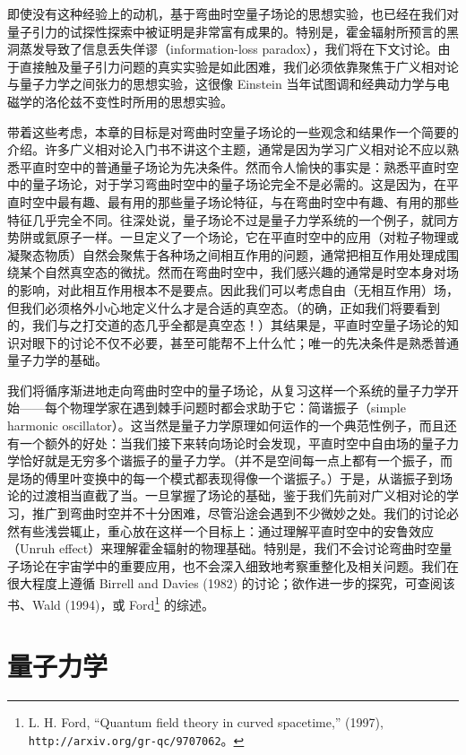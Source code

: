 即使没有这种经验上的动机，基于弯曲时空量子场论的思想实验，也已经在我们对量子引力的试探性探索中被证明是非常富有成果的。特别是，霍金辐射所预言的黑洞蒸发导致了信息丢失佯谬（information-loss paradox），我们将在下文讨论。由于直接触及量子引力问题的真实实验是如此困难，我们必须依靠聚焦于广义相对论与量子力学之间张力的思想实验，这很像 Einstein 当年试图调和经典动力学与电磁学的洛伦兹不变性时所用的思想实验。

带着这些考虑，本章的目标是对弯曲时空量子场论的一些观念和结果作一个简要的介绍。许多广义相对论入门书不讲这个主题，通常是因为学习广义相对论不应以熟悉平直时空中的普通量子场论为先决条件。然而令人愉快的事实是：熟悉平直时空中的量子场论，对于学习弯曲时空中的量子场论完全不是必需的。这是因为，在平直时空中最有趣、最有用的那些量子场论特征，与在弯曲时空中有趣、有用的那些特征几乎完全不同。往深处说，量子场论不过是量子力学系统的一个例子，就同方势阱或氦原子一样。一旦定义了一个场论，它在平直时空中的应用（对粒子物理或凝聚态物质）自然会聚焦于各种场之间相互作用的问题，通常把相互作用处理成围绕某个自然真空态的微扰。然而在弯曲时空中，我们感兴趣的通常是时空本身对场的影响，对此相互作用根本不是要点。因此我们可以考虑自由（无相互作用）场，但我们必须格外小心地定义什么才是合适的真空态。（的确，正如我们将要看到的，我们与之打交道的态几乎全都是真空态！）其结果是，平直时空量子场论的知识对眼下的讨论不仅不必要，甚至可能帮不上什么忙；唯一的先决条件是熟悉普通量子力学的基础。

我们将循序渐进地走向弯曲时空中的量子场论，从复习这样一个系统的量子力学开始——每个物理学家在遇到棘手问题时都会求助于它：简谐振子（simple harmonic oscillator）。这当然是量子力学原理如何运作的一个典范性例子，而且还有一个额外的好处：当我们接下来转向场论时会发现，平直时空中自由场的量子力学恰好就是无穷多个谐振子的量子力学。（并不是空间每一点上都有一个振子，而是场的傅里叶变换中的每一个模式都表现得像一个谐振子。）于是，从谐振子到场论的过渡相当直截了当。一旦掌握了场论的基础，鉴于我们先前对广义相对论的学习，推广到弯曲时空并不十分困难，尽管沿途会遇到不少微妙之处。我们的讨论必然有些浅尝辄止，重心放在这样一个目标上：通过理解平直时空中的安鲁效应（Unruh effect）来理解霍金辐射的物理基础。特别是，我们不会讨论弯曲时空量子场论在宇宙学中的重要应用，也不会深入细致地考察重整化及相关问题。我们在很大程度上遵循 Birrell and Davies (1982) 的讨论；欲作进一步的探究，可查阅该书、Wald (1994)，或 Ford\footnote{L. H. Ford, “Quantum field theory in curved spacetime,” (1997), \texttt{http://arxiv.org/gr-qc/9707062}。} 的综述。

\section{量子力学}

